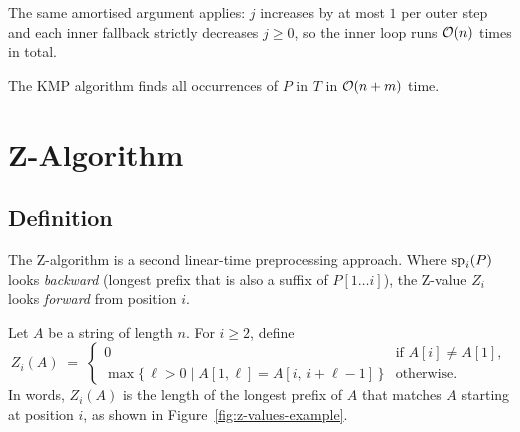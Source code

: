 The same amortised argument applies: $j$ increases by at most $1$ per outer step and each
inner fallback strictly decreases $j \geq 0$, so the inner loop runs $\mathcal{O}\!\left(n\right)$ times in total.

\begin{theorem}
  The KMP algorithm finds all occurrences of $P$ in $T$ in $\mathcal{O}\!\left(n + m\right)$ time.
\end{theorem}

\section{Z-Algorithm}

\subsection{Definition}

The Z-algorithm is a second linear-time preprocessing approach.
Where $\mathrm{sp}_{i}(P)$ looks \emph{backward} (longest prefix that is also a suffix of $P[1\ldots i]$),
the Z-value $Z_i$ looks \emph{forward} from position $i$.

\begin{definition}[Z values]
  Let $A$ be a string of length $n$. For $i \geq 2$, define
  \[
    Z_i(A) \;=\;
    \begin{cases}
      0 & \text{if } A[i] \neq A[1],\\[2pt]
      \max\bigl\{\, \ell > 0 \mid A[1,\ell] = A[i,\,i+\ell-1] \,\bigr\} & \text{otherwise.}
    \end{cases}
  \]
  In words, $Z_i(A)$ is the length of the longest prefix of $A$ that matches $A$ starting
  at position $i$, as shown in Figure~\ref{fig:z-values-example}.
\end{definition}

